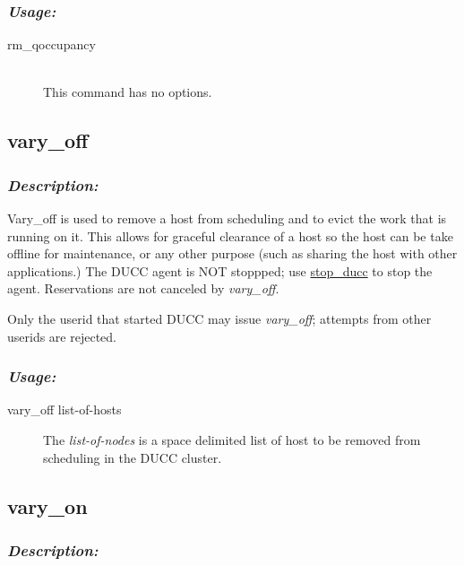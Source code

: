     \subsubsection{\em Usage:}

    \begin{description}
      \item[rm\_qoccupancy] \hfill \\ 
        This command has no options.
      \end{description}
             
       

\subsection{vary\_off}
\label{subsec:admin.vary-off}
    \subsubsection{{\em Description:}}

    Vary\_off is used to remove a host from scheduling and to evict the work that is running on it.
    This allows for graceful clearance of a host so the host can be take offline for maintenance,
    or any other purpose (such as sharing the host with other applications.)  The DUCC agent
    is NOT stoppped; use 
    \hyperref[subsec:admin.stop-ducc]{stop\_ducc} to stop the agent.  Reservations are not 
    canceled by {\em vary\_off}.
    
    Only the userid that started DUCC may issue {\em vary\_off}; attempts from other userids
    are rejected.

    \subsubsection{\em{Usage: }}

        \begin{description} 
          \item[vary\_off list-of-hosts]
            The {\em list-of-nodes} is a space delimited list of host to be removed from
              scheduling in the DUCC cluster.
        \end{description}
            
\subsection{vary\_on}
\label{subsec:admin.vary-on}
    \subsubsection{{\em Description:}}

